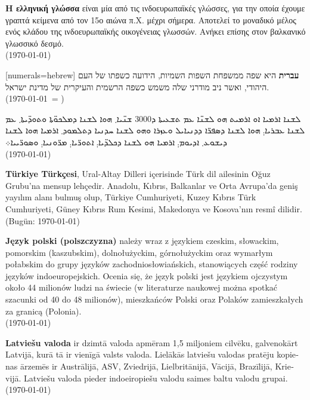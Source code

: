 \documentclass[a4paper]{article}
\begin{document}
\begin{greek}
\textbf{Η ελληνική γλώσσα} είναι μία από τις ινδοευρωπαϊκές γλώσσες, για την
οποία έχουμε γραπτά κείμενα από τον 15ο αιώνα π.Χ. μέχρι σήμερα. Αποτελεί το
μοναδικό μέλος ενός κλάδου της ινδοευρωπαϊκής οικογένειας γλωσσών. Ανήκει
επίσης στον βαλκανικό γλωσσικό δεσμό.\\	
(\today) 
\end{greek}


\begin{hebrew}[numerals=hebrew]
\textbf{עברית} היא שפה ממשפחת השפות השמיות, הידועה כשפתו של העם היהודי, ואשר ניב מודרני שלה משמש כשפה הרשמית והעיקרית של מדינת ישראל. \\
(\today\ = \hebrewtoday)
\end{hebrew}

\begin{syriac}%
ܠܫܢܐ ܐܪܡܝܐ ܐܘ ܐܪܡܝܬ ܗܘ ܠܫܢ̈ܐ ܥܡ ܬܫܥܝܬܐ ܕ\textrm{3000} ܫܢ̈ܝܐ܂ ܗܘܐ ܠܫܢܐ ܕܡܠܟܘ̈ܬܐ ܘܬܘܕ̈ܝܬܐ܂ ܥܡ ܠܫܢܐ ܥܒܪܝܐ܄ ܗܘܐ ܠܫܢܐ ܕܣܦܪ̈ܐ ܕܕܢܝܐܝܠ ܘܥܙܪܐ ܘܗܘ ܠܫܢܐ ܚܕܢܝܐ ܕܬܠܡܘܕ܂ ܐܪܡܝܐ ܗܘܐ ܠܫܢܐ ܕܝܫܘܥ܂ ܐܕܝܘܡ܄ ܐܪܡܝܐ ܗܘ ܠܫܢܐ ܕܟܠܕ̈ܝܐ܄ ܐܬܘܪ̈ܝܐ܄ ܡܪ̈ܘܢܝܐ܄ ܘܣܘܪ̈ܝܝܐ܀ \\
(\today)
\end{syriac}

\begin{turkish}
\textbf{Türkiye Türkçesi}, Ural-Altay Dilleri içerisinde Türk dil ailesinin Oğuz Grubu'na mensup lehçedir. Anadolu, Kıbrıs, Balkanlar ve Orta Avrupa'da geniş yayılım alanı bulmuş olup, Türkiye Cumhuriyeti, Kuzey Kıbrıs Türk Cumhuriyeti, Güney Kıbrıs Rum Kesimi, Makedonya ve Kosova'nın resmî dilidir. \\
(Bugün: \today)
\end{turkish}

\begin{polish}
\textbf{Język polski (polszczyzna)} należy wraz z językiem czeskim, słowackim, pomorskim (kaszubskim), dolnołużyckim, górnołużyckim oraz wymarłym połabskim do grupy języków zachodniosłowiańskich, stanowiących część rodziny języków indoeuropejskich. Ocenia się, że język polski jest językiem ojczystym około 44 milionów ludzi na świecie (w literaturze naukowej można spotkać szacunki od 40 do 48 milionów), mieszkańców Polski oraz Polaków zamieszkałych za granicą (Polonia).\\
(\today)
\end{polish}

\begin{latvian} 
\textbf{Latviešu valoda} ir dzimtā valoda apmēram 1,5 miljoniem cilvēku, galvenokārt Latvijā, kurā tā ir vienīgā valsts valoda. Lielākās latviešu valodas pratēju kopienas ārzemēs ir Austrālijā, ASV, Zviedrijā, Lielbritānijā, Vācijā, Brazīlijā, Krievijā. Latviešu valoda pieder indoeiropiešu valodu saimes baltu valodu grupai.\\
(\today)
\end{latvian}
\end{document}
